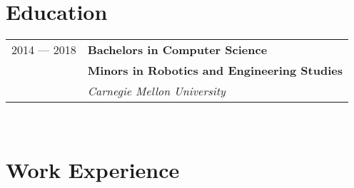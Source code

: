 \documentclass[10pt]{article} %
\begin{document}
\color{text1} %


\par{\\


\begin{minipage}[t]{0.5\textwidth} %
\vspace{15pt} %
	

\section{Education} 

\begin{tabular}{rl} %


2014 --- 2018 & \textbf{Bachelors in Computer Science} \\
& {\small \textbf{Minors in Robotics and Engineering Studies}} \\
& \textit{Carnegie Mellon University} \\
\end{tabular}\\[10pt]

%

\section{Work Experience} 


\end{minipage}}
\end{document}
